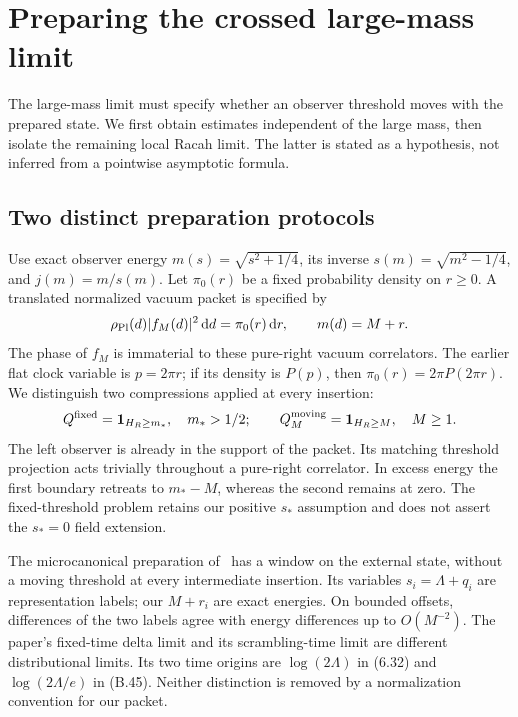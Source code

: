 \section{Preparing the crossed large-mass limit}
\label{sec:crosslimit}
The large-mass limit must specify whether an observer threshold moves
with the prepared state. We first obtain estimates independent of the
large mass, then isolate the remaining local Racah limit. The latter is
stated as a hypothesis, not inferred from a pointwise asymptotic formula.

\subsection{Two distinct preparation protocols}
Use exact observer energy $m(s)=\sqrt{s^2+1/4}$, its inverse
$s(m)=\sqrt{m^2-1/4}$, and $j(m)=m/s(m)$. Let $\pi_0(r)$ be a fixed
probability density on $r\ge0$. A translated normalized vacuum packet is
specified by
\begin{equation}
 \rho_{\mathrm{Pl}}(d)|f_M(d)|^2\mathop{}\!\mathrm d d=\pi_0(r)\mathop{}\!\mathrm d r,
 \qquad m(d)=M+r.
 \label{eq:translated-energy-packet}
\end{equation}
The phase of $f_M$ is immaterial to these pure-right vacuum correlators.
The earlier flat clock variable is $p=2\pi r$; if its density is $P(p)$,
then $\pi_0(r)=2\pi P(2\pi r)$.
We distinguish two compressions applied at every insertion:
\begin{equation}
 Q^{\rm fixed}=\mathbf 1_{H_R\ge m_*},\quad m_*>1/2;
 \qquad Q^{\rm moving}_M=\mathbf 1_{H_R\ge M},\quad M\ge1.
 \label{eq:two-thresholds}
\end{equation}
The left observer is already in the support of the packet. Its matching
threshold projection acts trivially throughout a pure-right correlator.
In excess energy the first boundary retreats to $m_*-M$, whereas the
second remains at zero. The fixed-threshold problem retains our positive
$s_*$ assumption and does not assert the $s_*=0$ field extension.

The microcanonical preparation of~\cite[(6.29), (B.43)]{KL} has a window
on the external state, without a moving threshold at every intermediate
insertion. Its variables $s_i=\Lambda+q_i$ are representation labels;
our $M+r_i$ are exact energies. On bounded offsets, differences of the
two labels agree with energy differences up to $O(M^{-2})$.
The paper's fixed-time delta limit and its scrambling-time limit are
different distributional limits. Its two time origins are
$\log(2\Lambda)$ in (6.32) and $\log(2\Lambda/e)$ in (B.45).
Neither distinction is removed by a normalization convention for our
packet.


